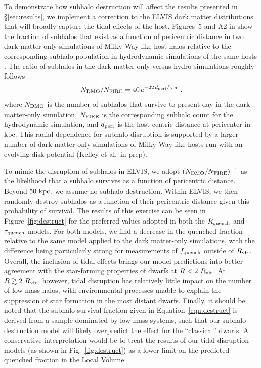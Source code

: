 To demonstrate how subhalo destruction will affect the results presented in
\S\ref{sec:results}, we implement a correction to the ELVIS dark matter
distributions that will broadly capture the tidal effects of the host.
%
Figures~5 and A2 in \citet{gk17} show the fraction of subhalos that exist as a
function of pericentric distance in two dark matter-only simulations of Milky
Way-like host halos relative to the corresponding subhalo population in
hydrodynamic simulations of the same hosts \citep[using the FIRE model for star
formation and feedback,][]{wetzel16, hopkins14, hopkins17}.
%
The ratio of subhalos in the dark matter-only versus hydro simulations roughly
follows
%
\begin{equation}
  N_{\rm DMO} / N_{\rm FIRE} =  40 \, e^{-22 \, d_{\rm peri}/{\rm kpc}} \; ,
\label{eqn:destruct}
\end{equation}
%
where $N_ {\rm DMO}$ is the number of subhalos that survive to present day in
the dark matter-only simulation, $N_ {\rm FIRE}$ is the corresponding subhalo
count for the hydrodynamic simulation, and $d_{\rm peri}$ is the host-centric
distance at pericenter in kpc.
%
This radial dependence for subhalo disruption is supported by a larger number of
dark matter-only simulations of Milky Way-like hosts run with an evolving disk
potential (Kelley et al.~in prep).


To mimic the disruption of subhalos in ELVIS, we adopt $(N_{\rm DMO}/N_{\rm
  FIRE})^{-1}$ as the likelihood that a subhalo survives as a function of
pericentric distance.
%
Beyond $50~{\rm kpc}$, we assume no subhalo destruction.
%
Within ELVIS, we then randomly destroy subhalos as a function of their
pericentric distance given this probability of survival.
%
The results of this exercise can be seen in Figure~\ref{fig:destruct} for the
preferred values adopted in both the $R_{\rm quench}$ and $\tau_{\rm quench}$
models. For both models, we find a decrease in the quenched fraction relative to
the same model applied to the dark matter-only simulations, with the difference
being particularly strong for measurements of $f_{\rm quench}$ outside of
$R_{\rm{vir}}$.
%
Overall, the inclusion of tidal effects brings our model predictions into better
agreement with the star-forming properties of dwarfs at $R < 2~R_{\rm{vir}}$. 
%
At $R \gtrsim 2~R_{\rm{vir}}$, however, tidal disruption has relatively little impact on the
number of low-mass halos, with environmental processes unable to explain the
suppression of star formation in the most distant dwarfs. 
%
Finally, it should be noted that the subhalo survival fraction given in
Equation~\ref{eqn:destruct} is derived from a sample dominated by low-mass
systems, such that our subhalo destruction model will likely overpredict the
effect for the ``classical'' dwarfs. A conservative interpretation would be to
treat the results of our tidal disruption models (as shown in
Fig.~\ref{fig:destruct}) as a lower limit on the predicted quenched fraction in
the Local Volume.







